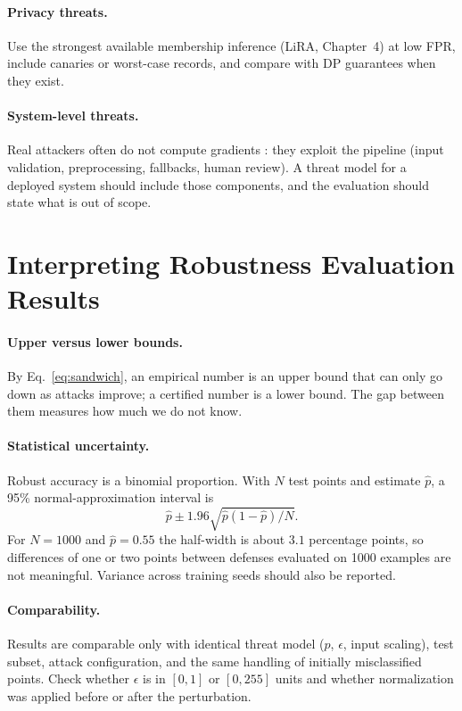 \documentclass[10pt,a4paper]{extarticle}
\theoremstyle{definition}
\begin{document}
\paragraph{Privacy threats.} Use the strongest available membership inference (LiRA, Chapter~4) at low FPR, include canaries or worst-case records, and compare with DP guarantees when they exist.

\paragraph{System-level threats.} Real attackers often do not compute gradients \citep{apruzzese2023real}: they exploit the pipeline (input validation, preprocessing, fallbacks, human review). A threat model for a deployed system should include those components, and the evaluation should state what is out of scope.

\section{Interpreting Robustness Evaluation Results}

\paragraph{Upper versus lower bounds.} By Eq.~\eqref{eq:sandwich}, an empirical number is an upper bound that can only go down as attacks improve; a certified number is a lower bound. The gap between them measures how much we do not know.

\paragraph{Statistical uncertainty.} Robust accuracy is a binomial proportion. With \(N\) test points and estimate \(\hat p\), a 95\% normal-approximation interval is
\[
\hat p\pm1.96\sqrt{\hat p(1-\hat p)/N}.
\]
For \(N=1000\) and \(\hat p=0.55\) the half-width is about \(3.1\) percentage points, so differences of one or two points between defenses evaluated on 1000 examples are not meaningful. Variance across training seeds should also be reported.

\paragraph{Comparability.} Results are comparable only with identical threat model (\(p\), \(\epsilon\), input scaling), test subset, attack configuration, and the same handling of initially misclassified points. Check whether \(\epsilon\) is in \([0,1]\) or \([0,255]\) units and whether normalization was applied before or after the perturbation.
\end{document}
